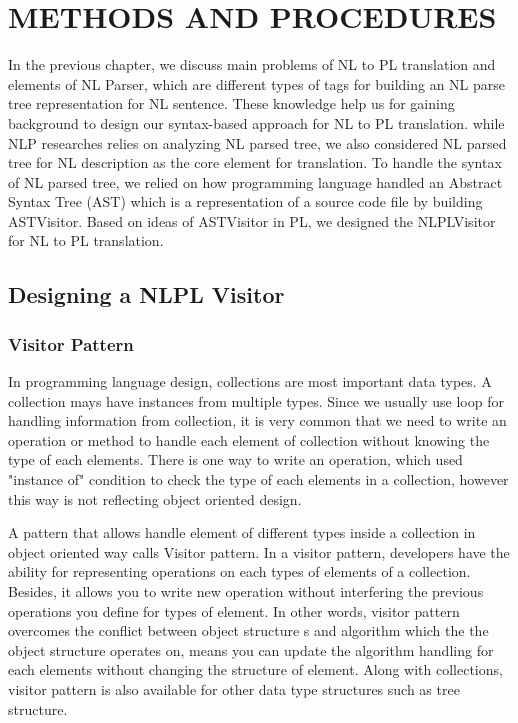 \chapter{METHODS AND PROCEDURES}
In the previous chapter, we discuss main problems of NL to PL translation and elements of NL Parser, which are different types of tags for building an NL parse tree representation for NL sentence. These knowledge help us for gaining background to design our syntax-based approach for NL to PL translation. while NLP researches relies on analyzing NL parsed tree, we also considered NL parsed tree for NL description as the core element for translation. To handle the syntax of NL parsed tree, we relied on how programming language handled an Abstract Syntax Tree (AST) which is a representation of a source code file by building ASTVisitor. Based on ideas of ASTVisitor in PL, we designed the NLPLVisitor for NL to PL translation.  
\section{Designing a NLPL Visitor}
\subsection{Visitor Pattern}
In programming language design, collections are most important data types. A collection mays have instances from multiple types. Since we usually use loop for handling information from collection, it is very common that we need to write an operation or method to handle each element of collection without knowing the type of each elements. There is one way to write an operation, which used "instance of" condition to check the type of each elements in a collection, however this way is not reflecting object oriented design. 

A pattern that allows handle element of different types inside a collection in object oriented way calls Visitor pattern. In a visitor pattern, developers have the ability for representing operations on each types of elements of a collection. Besides, it allows you to write new operation without interfering the previous operations you define for types of element. In other words, visitor pattern overcomes the conflict between object structure s and algorithm  which the the object structure operates on, means you can update the algorithm handling for each elements without changing the structure of element. Along with collections, visitor pattern is also available for other data type structures such as tree structure.

